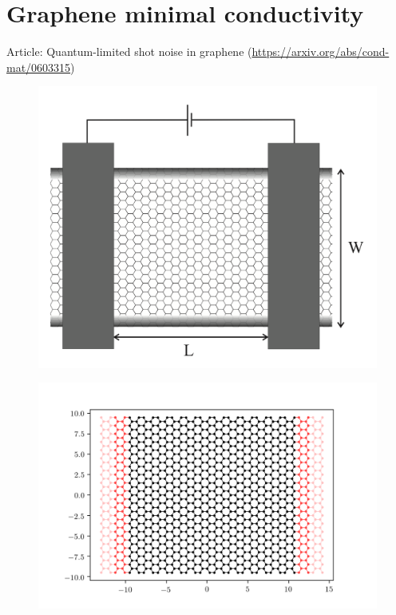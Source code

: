 \documentclass[12pt]{article}
\numberwithin{equation}{section}
\begin{document}
\section{Graphene minimal conductivity}
Article: Quantum-limited shot noise in graphene (\url{https://arxiv.org/abs/cond-mat/0603315})
\begin{figure}[h!]
  \begin{center}
  \includegraphics[height=0.75\textheight]{./media/graphene-schema.png}
  \end{center}
\end{figure}

\newpage
\begin{figure}[h!]
  \begin{center}
  \includegraphics[height=0.75\textheight]{./media/graphene_layer_W=20L=20.png}
  \end{center}
\end{figure}
\end{document}
